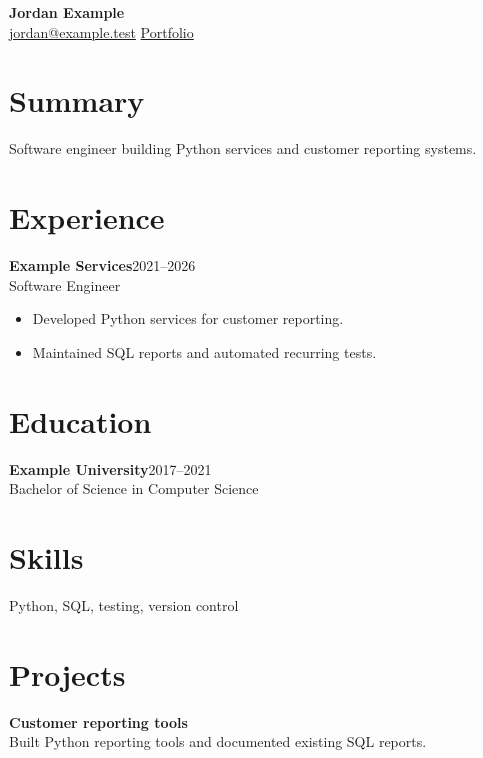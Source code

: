 \documentclass[10pt]{article}
\begin{document}
\begin{center}
{\Large\bfseries Jordan Example}\\
\href{mailto:jordan@example.test}{jordan@example.test}\quad
\href{https://example.test/jordan}{Portfolio}
\end{center}
\section*{Summary}
Software engineer building Python services and customer reporting systems.
\section*{Experience}
\textbf{Example Services}\hfill 2021--2026\\
Software Engineer
\begin{itemize}
\item[-] Developed Python services for customer reporting.
\item[-] Maintained SQL reports and automated recurring tests.
\end{itemize}
\newpage
\section*{Education}
\textbf{Example University}\hfill 2017--2021\\
Bachelor of Science in Computer Science
\section*{Skills}
Python, SQL, testing, version control
\section*{Projects}
\textbf{Customer reporting tools}\\
Built Python reporting tools and documented existing SQL reports.
\end{document}
